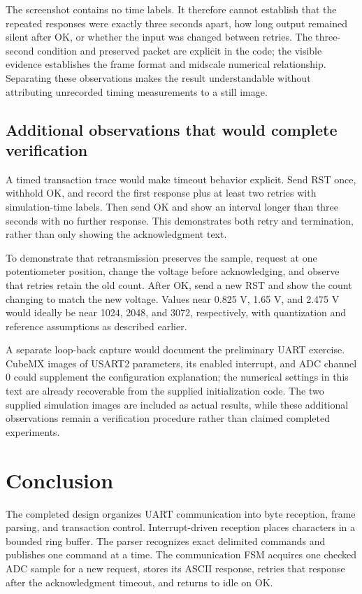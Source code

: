 \documentclass[a4paper]{article}
\newcommand{\topic}[1]{\subsection{#1}}
\begin{document}
The screenshot contains no time labels. It therefore cannot establish that
the repeated responses were exactly three seconds apart, how long output
remained silent after OK, or whether the input was changed between retries.
The three-second condition and preserved packet are explicit in the code;
the visible evidence establishes the frame format and midscale numerical
relationship. Separating these observations makes the result understandable
without attributing unrecorded timing measurements to a still image.


\topic{Additional observations that would complete verification}

A timed transaction trace would make timeout behavior explicit. Send RST
once, withhold OK, and record the first response plus at least two retries
with simulation-time labels. Then send OK and show an interval longer than
three seconds with no further response. This demonstrates both retry and
termination, rather than only showing the acknowledgment text.

To demonstrate that retransmission preserves the sample, request at one
potentiometer position, change the voltage before acknowledging, and observe
that retries retain the old count. After OK, send a new RST and show the count
changing to match the new voltage. Values near 0.825 V, 1.65 V, and 2.475 V
would ideally be near 1024, 2048, and 3072, respectively, with quantization
and reference assumptions as described earlier.

A separate loop-back capture would document the preliminary UART exercise.
CubeMX images of USART2 parameters, its enabled interrupt, and ADC channel 0
could supplement the configuration explanation; the numerical settings in
this text are already recoverable from the supplied initialization code.
The two supplied simulation images are included as actual results, while
these additional observations remain a verification procedure rather than
claimed completed experiments.


\section{Conclusion}

The completed design organizes UART communication into byte reception,
frame parsing, and transaction control. Interrupt-driven reception places
characters in a bounded ring buffer. The parser recognizes exact delimited
commands and publishes one command at a time. The communication FSM acquires
one checked ADC sample for a new request, stores its ASCII response, retries
that response after the acknowledgment timeout, and returns to idle on OK.
\end{document}
